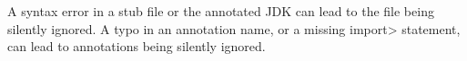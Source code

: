 A syntax error in a stub file or the annotated JDK can lead to the file
being silently ignored.  A typo in an annotation name, or a missing
\<import> statement, can lead to annotations being silently ignored.


